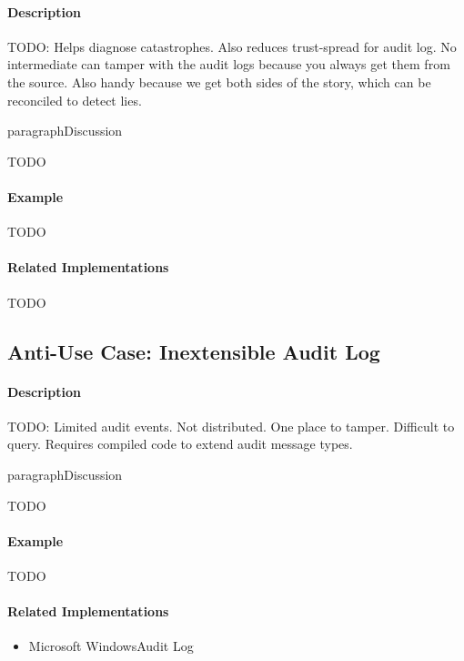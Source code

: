 \paragraph{Description}

{\Large TODO:} Helps diagnose catastrophes.  Also reduces trust-spread for audit log.  No intermediate can tamper with the audit logs because you always get them from the source.  Also handy because we get both sides of the story, which can be reconciled to detect lies.

paragraph{Discussion}

{\Large TODO}

\paragraph{Example}

{\Large TODO}

\paragraph{Related Implementations}

{\Large TODO}

\subsection{Anti-Use Case: Inextensible Audit Log}

\paragraph{Description}

{\Large TODO:} Limited audit events. Not distributed. One place to tamper. Difficult to query. Requires compiled code to extend audit message types.

paragraph{Discussion}

{\Large TODO}

\paragraph{Example}

{\Large TODO}

\paragraph{Related Implementations}

\begin{itemize}
	\item Microsoft Windows\texttrademark Audit Log
\end{itemize}
